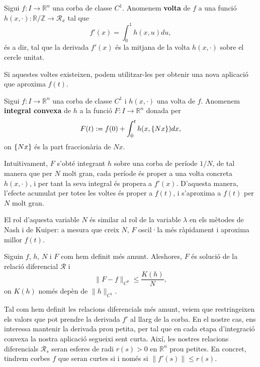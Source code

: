 \begin{defi}
    Sigui $f:I\to\mathbb R^n$ una corba de classe $C^1$. Anomenem \textbf{volta} de $f$ a una funció $h(x, \cdot): \mathbb R / \mathbb Z \to \mathcal R_x$ tal que
    \begin{equation}\label{eq:def voltes}
        f'(x) = \int_0^1 h(x, u)  du,
    \end{equation}
    és a dir, tal que la derivada $f'(x)$ és la mitjana de la volta $h(x, \cdot)$ sobre el cercle unitat.
\end{defi}

Si aquestes voltes existeixen, podem utilitzar-les per obtenir una nova aplicació que aproxima $f(t)$.
\begin{defi}
    Sigui $f:I\to\mathbb R^n$ una corba de classe $C^1$ i $h(x, \cdot)$ una volta de $f$. Anomenem \textbf{integral convexa} de $h$ a la funció $F:I\to\mathbb R^n$ donada per
    \begin{equation*}
        F(t) := f(0) + \int_0^t h(x, \{Nx\})  dx,
    \end{equation*}
    on $\{Nx\}$ és la part fraccionària de $Nx$.
\end{defi}    

Intuïtivament, $F$ s'obté integrant $h$ sobre una corba de període $1/N$, de tal manera que per $N$ molt gran, cada període és proper a una volta concreta $h(x, \cdot)$, i per tant la seva integral és propera a $f'(x)$. D'aquesta manera, l'efecte acumulat per totes les voltes és proper a $f(t)$, i s'aproxima a $f(t)$ per $N$ molt gran. 
\begin{obs}
    El rol d'aquesta variable $N$ és similar al rol de la variable $\lambda$ en els mètodes de Nash i de Kuiper: a mesura que creix $N$, $F$ oscil·la més ràpidament i aproxima millor $f(t)$.
\end{obs}

\begin{lema}\label{lema:C0-1D}
    Siguin $f$, $h$, $N$ i $F$ com hem definit més amunt. Aleshores, $F$ és solució de la relació diferencial $\mathcal R$ i 
    \begin{equation}
    \|F-f\|_{C^0} \le \frac{K(h)}{N},
    \end{equation}
    on $K(h)$ només depèn de $\|h\|_{C^1}$.
\end{lema}

Tal com hem definit les relacions diferencials més amunt, veiem que restringeixen els valors que pot prendre la derivada $f'$ al llarg de la corba. En el nostre cas, ens interessa mantenir la derivada prou petita, per tal que en cada etapa d'integració convexa la nostra aplicació segueixi sent curta. Així, les nostres relacions diferencials $\mathcal R_s$ seran esferes de radi $r(s)>0$ en $\mathbb R^n$ prou petites. En concret, tindrem corbes $f$ que seran curtes si i només si $\|f'(s)\|\le r(s)$.

